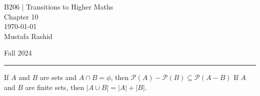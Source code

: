 \documentclass[12pt,letterpaper, onecolumn]{exam}
\begin{document}
	\begingroup  
	\noindent\LARGE B206 | Transitions to Higher Maths\\
	\noindent\LARGE Chapter 10\\
	\noindent\large \today\\
	\noindent\large Mustafa Rashid\par
	\noindent\large Fall 2024\par
	\endgroup
	\rule{\textwidth}{0.4pt}
	\pointsdroppedatright
	\printanswers
	\renewcommand{\solutiontitle}{\noindent\textbf{Ans:}\enspace}  
	\begin{questions}
		\setcounter{question}{9}\question If $A$ and $B$ are sets and $A\cap B=\phi$, then $\mathscr{P}(A)-\mathscr{P}(B)\subseteq\mathscr{P}(A-B)$
		\setcounter{question}{15}\question  If $A$ and $B$ are finite sets, then $|A\cup B|=|A|+|B|$.
	\end{questions}	
	
\end{document}
